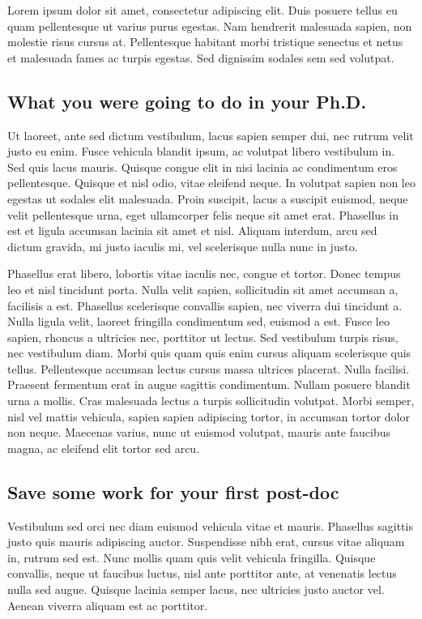Lorem ipsum dolor sit amet, consectetur adipiscing elit. Duis posuere tellus eu quam pellentesque ut varius purus egestas. Nam hendrerit malesuada sapien, non molestie risus cursus at. Pellentesque habitant morbi tristique senectus et netus et malesuada fames ac turpis egestas. Sed dignissim sodales sem sed volutpat. 

\subsection{What you were going to do in your Ph.D.}

Ut laoreet, ante sed dictum vestibulum, lacus sapien semper dui, nec rutrum velit justo eu enim. Fusce vehicula blandit ipsum, ac volutpat libero vestibulum in. Sed quis lacus mauris. Quisque congue elit in nisi lacinia ac condimentum eros pellentesque. Quisque et nisl odio, vitae eleifend neque. In volutpat sapien non leo egestas ut sodales elit malesuada. Proin suscipit, lacus a suscipit euismod, neque velit pellentesque urna, eget ullamcorper felis neque sit amet erat. Phasellus in est et ligula accumsan lacinia sit amet et nisl. Aliquam interdum, arcu sed dictum gravida, mi justo iaculis mi, vel scelerisque nulla nunc in justo.

Phasellus erat libero, lobortis vitae iaculis nec, congue et tortor. Donec tempus leo et nisl tincidunt porta. Nulla velit sapien, sollicitudin sit amet accumsan a, facilisis a est. Phasellus scelerisque convallis sapien, nec viverra dui tincidunt a. Nulla ligula velit, laoreet fringilla condimentum sed, euismod a est. Fusce leo sapien, rhoncus a ultricies nec, porttitor ut lectus. Sed vestibulum turpis risus, nec vestibulum diam. Morbi quis quam quis enim cursus aliquam scelerisque quis tellus. Pellentesque accumsan lectus cursus massa ultrices placerat. Nulla facilisi. Praesent fermentum erat in augue sagittis condimentum. Nullam posuere blandit urna a mollis. Cras malesuada lectus a turpis sollicitudin volutpat. Morbi semper, nisl vel mattis vehicula, sapien sapien adipiscing tortor, in accumsan tortor dolor non neque. Maecenas varius, nunc ut euismod volutpat, mauris ante faucibus magna, ac eleifend elit tortor sed arcu.


\subsection{Save some work for your first post-doc}

Vestibulum sed orci nec diam euismod vehicula vitae et mauris. Phasellus sagittis justo quis mauris adipiscing auctor. Suspendisse nibh erat, cursus vitae aliquam in, rutrum sed est. Nunc mollis quam quis velit vehicula fringilla. Quisque convallis, neque ut faucibus luctus, nisl ante porttitor ante, at venenatis lectus nulla sed augue. Quisque lacinia semper lacus, nec ultricies justo auctor vel. Aenean viverra aliquam est ac porttitor.


